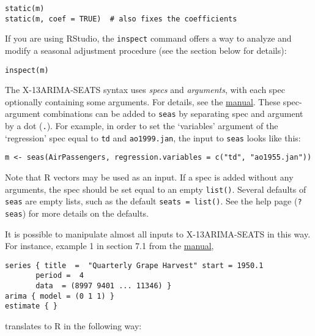 \begin{verbatim}
static(m)
static(m, coef = TRUE)  # also fixes the coefficients
\end{verbatim}

If you are using RStudio, the \texttt{inspect} command offers a way to
analyze and modify a seasonal adjustment procedure (see the section
below for details):

\begin{verbatim}
inspect(m)
\end{verbatim}


The X-13ARIMA-SEATS syntax uses \emph{specs} and \emph{arguments}, with
each spec optionally containing some arguments. For details, see the
\href{http://www.census.gov/ts/x13as/docX13AS.pdf}{manual}. These
spec-argument combinations can be added to \texttt{seas} by separating
spec and argument by a dot (\texttt{.}). For example, in order to set
the `variables' argument of the `regression' spec equal to \texttt{td}
and \texttt{ao1999.jan}, the input to \texttt{seas} looks like this:

\begin{verbatim}
m <- seas(AirPassengers, regression.variables = c("td", "ao1955.jan"))
\end{verbatim}

Note that R vectors may be used as an input. If a spec is added without
any arguments, the spec should be set equal to an empty \texttt{list()}.
Several defaults of \texttt{seas} are empty lists, such as the default
\texttt{seats = list()}. See the help page (\texttt{?seas}) for more
details on the defaults.

It is possible to manipulate almost all inputs to X-13ARIMA-SEATS in
this way. For instance, example 1 in section 7.1 from the
\href{http://www.census.gov/ts/x13as/docX13AS.pdf}{manual},

\begin{verbatim}
series { title  =  "Quarterly Grape Harvest" start = 1950.1
       period =  4
       data  = (8997 9401 ... 11346) }
arima { model = (0 1 1) }
estimate { }
\end{verbatim}

translates to R in the following way:

